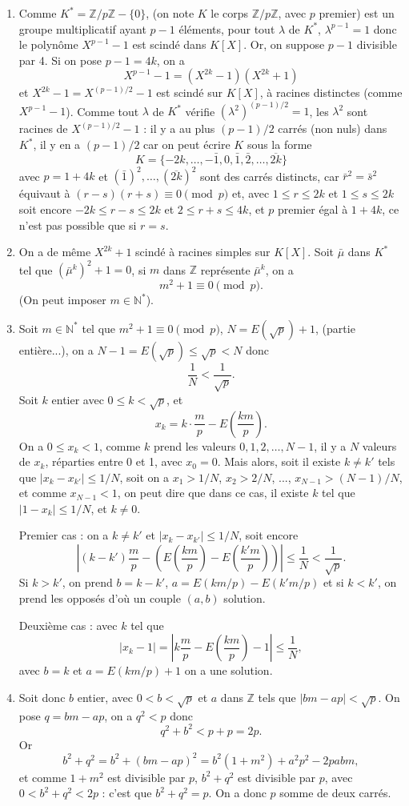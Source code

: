 \begin{enumerate}[label=\arabic*.,leftmargin=2.2em,itemsep=1.15em]
\begin{enumerate}[label=\alph*),leftmargin=2em]
\item Comme $K^*=\mathbb Z/p\mathbb Z-\{0\}$, (on note $K$ le corps $\mathbb Z/p\mathbb Z$, avec $p$ premier) est un groupe multiplicatif ayant $p-1$ éléments, pour tout $\lambda$ de $K^*$, $\lambda^{p-1}=1$ donc le polynôme $X^{p-1}-1$ est scindé dans $K[X]$. Or, on suppose $p-1$ divisible par 4. Si on pose $p-1=4k$, on a
\[
X^{p-1}-1=(X^{2k}-1)(X^{2k}+1)
\]
et $X^{2k}-1=X^{(p-1)/2}-1$ est scindé sur $K[X]$, à racines distinctes (comme $X^{p-1}-1$). Comme tout $\lambda$ de $K^*$ vérifie $(\lambda^2)^{(p-1)/2}=1$, les $\lambda^2$ sont racines de $X^{(p-1)/2}-1$ : il y a au plus $(p-1)/2$ carrés (non nuls) dans $K^*$, il y en a $(p-1)/2$ car on peut écrire $K$ sous la forme
\[
K=\{-2k,\ldots,-\bar1,0,\bar1,\bar2,\ldots,\overline{2k}\}
\]
avec $p=1+4k$ et $(\bar1)^2,\ldots,(\overline{2k})^2$ sont des carrés distincts, car $\bar r^2=\bar s^2$ équivaut à $(r-s)(r+s)\equiv0\pmod p$ et, avec $1\le r\le2k$ et $1\le s\le2k$ soit encore $-2k\le r-s\le2k$ et $2\le r+s\le4k$, et $p$ premier égal à $1+4k$, ce n'est pas possible que si $r=s$.

\item On a de même $X^{2k}+1$ scindé à racines simples sur $K[X]$. Soit $\bar\mu$ dans $K^*$ tel que $(\bar\mu^k)^2+1=0$, si $m$ dans $\mathbb Z$ représente $\bar\mu^k$, on a
\[
m^2+1\equiv0\pmod p.
\]
(On peut imposer $m\in\mathbb N^*$).

\item Soit $m\in\mathbb N^*$ tel que $m^2+1\equiv0\pmod p$, $N=E(\sqrt p)+1$, (partie entière...), on a $N-1=E(\sqrt p)\le\sqrt p<N$ donc
\[
\frac1N<\frac1{\sqrt p}.
\]
Soit $k$ entier avec $0\le k<\sqrt p$, et
\[
x_k=k\cdot\frac mp-E\left(\frac{km}{p}\right).
\]
On a $0\le x_k<1$, comme $k$ prend les valeurs $0,1,2,\ldots,N-1$, il y a $N$ valeurs de $x_k$, réparties entre 0 et 1, avec $x_0=0$. Mais alors, soit il existe $k\ne k'$ tels que $|x_k-x_{k'}|\le1/N$, soit on a $x_1>1/N$, $x_2>2/N$, ..., $x_{N-1}>(N-1)/N$, et comme $x_{N-1}<1$, on peut dire que dans ce cas, il existe $k$ tel que $|1-x_k|\le1/N$, et $k\ne0$.

Premier cas : on a $k\ne k'$ et $|x_k-x_{k'}|\le1/N$, soit encore
\[
\left|(k-k')\frac mp-\left(E\left(\frac{km}{p}\right)-E\left(\frac{k'm}{p}\right)\right)\right|\le\frac1N<\frac1{\sqrt p}.
\]
Si $k>k'$, on prend $b=k-k'$, $a=E(km/p)-E(k'm/p)$ et si $k<k'$, on prend les opposés d'où un couple $(a,b)$ solution.

Deuxième cas : avec $k$ tel que
\[
|x_k-1|=\left|k\frac mp-E\left(\frac{km}{p}\right)-1\right|\le\frac1N,
\]
avec $b=k$ et $a=E(km/p)+1$ on a une solution.

\item Soit donc $b$ entier, avec $0<b<\sqrt p$ et $a$ dans $\mathbb Z$ tels que $|bm-ap|<\sqrt p$. On pose $q=bm-ap$, on a $q^2<p$ donc
\[
q^2+b^2<p+p=2p.
\]
Or
\[
b^2+q^2=b^2+(bm-ap)^2=b^2(1+m^2)+a^2p^2-2pabm,
\]
et comme $1+m^2$ est divisible par $p$, $b^2+q^2$ est divisible par $p$, avec $0<b^2+q^2<2p$ : c'est que $b^2+q^2=p$. On a donc $p$ somme de deux carrés.
\end{enumerate}

\end{enumerate}
